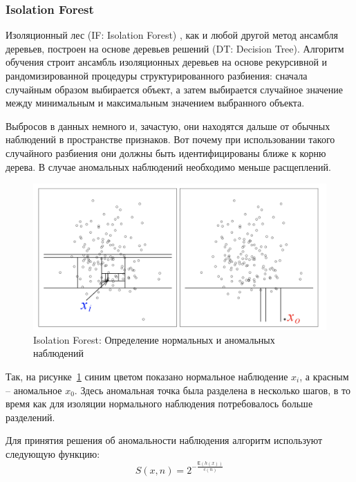 \documentclass[12pt]{article}
\begin{document}
    \subsubsection{Isolation Forest}
    \label{sec:Research:Model:IsolationForest}

    \par Изоляционный лес (IF: Isolation Forest) \cite{IsolationForest}, как и любой другой метод ансамбля деревьев, построен на основе деревьев решений (DT: Decision Tree). Алгоритм обучения строит ансамбль изоляционных деревьев на основе рекурсивной и рандомизированной процедуры структурированного разбиения: сначала случайным образом выбирается объект, а затем выбирается случайное значение между минимальным и максимальным значением выбранного объекта.

    \par Выбросов в данных немного и, зачастую, они находятся дальше от обычных наблюдений в пространстве признаков. Вот почему при использовании такого случайного разбиения они должны быть идентифицированы ближе к корню дерева. В случае аномальных наблюдений необходимо меньше расщеплений.

    \begin{figure}[h!]
        \centering
        \includegraphics[width=0.8\linewidth]{IsolationForest.png}
        \caption{Isolation Forest: Определение нормальных и аномальных наблюдений}
        \label{sec:Research:Model:IsolationForest:fig:IsolationForest}
    \end{figure}

    \par Так, на рисунке~\ref{sec:Research:Model:IsolationForest:fig:IsolationForest} синим цветом показано нормальное наблюдение $x_i$, а красным -- аномальное $x_0$. Здесь аномальная точка была разделена в несколько шагов, в то время как для изоляции нормального наблюдения потребовалось больше разделений.

    \par Для принятия решения об аномальности наблюдения алгоритм используют следующую функцию:
    \begin{equation}
    \label{sec:Research:Model:IsolationForest:formula:IF}
        S(x,n) = 2^{-\frac{\mathsf{E}(h(x))}{c(n)}}
    \end{equation}
\end{document}
